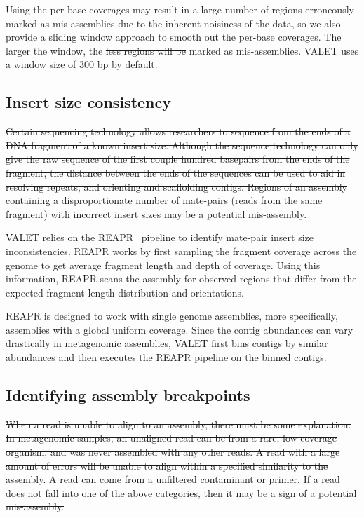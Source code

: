 \documentclass[12pt,\mydriver]{thesis}
\providecommand{\DIFaddtex}[1]{{\protect\color{blue}\uwave{#1}}} %
\providecommand{\DIFdeltex}[1]{{\protect\color{red}\sout{#1}}}                      %
\providecommand{\DIFaddbegin}{} %
\providecommand{\DIFaddend}{} %
\providecommand{\DIFdelbegin}{} %
\providecommand{\DIFdelend}{} %
\providecommand{\DIFadd}[1]{\texorpdfstring{\DIFaddtex{#1}}{#1}} %
\providecommand{\DIFdel}[1]{\texorpdfstring{\DIFdeltex{#1}}{}} %
\begin{document}
Using the per-base coverages may result in a large number of regions erroneously marked as mis-assemblies due to the inherent noisiness of the data, so we also provide a sliding window approach to smooth out the per-base coverages. The larger the window, the \DIFdelbegin \DIFdel{less regions will be }\DIFdelend \DIFaddbegin \DIFadd{fewer the regions }\DIFaddend marked as mis-assemblies.
VALET uses a window size of 300 bp by default.

\subsection{Insert size consistency}
\DIFdelbegin \DIFdel{Certain sequencing technology allows researchers to sequence from the ends of a DNA fragment of a known insert size.  Although the sequence technology can only give the raw sequence of the first couple hundred basepairs from the ends of the fragment, the distance between the ends of the sequences can be used to aid in resolving repeats, and orienting and scaffolding contigs.  Regions of an assembly containing a disproportionate number of mate-pairs (reads from the same fragment) with incorrect insert sizes may be a potential mis-assembly.
}\DIFdelend 


VALET relies on the REAPR~\cite{hunt2013reapr} pipeline to identify mate-pair insert size inconsistencies.  REAPR works by first sampling the fragment coverage across the genome to get average fragment length and depth of coverage.  Using this information, REAPR scans the assembly for observed regions that differ from the expected fragment length distribution and orientations.

REAPR is designed to work with single genome assemblies, more specifically, assemblies with a global uniform coverage.  Since the contig abundances can vary drastically in metagenomic assemblies, VALET first bins contigs by similar abundances and then executes the REAPR pipeline on the binned contigs.

\subsection{Identifying assembly breakpoints}
\DIFdelbegin \DIFdel{When a read is unable to align to an assembly, there must be some explanation.
In metagenomic samples, an unaligned read can be from a rare, low coverage organism, and was never assembled with any other reads.
A read with a large amount of errors will be unable to align within a specified similarity to the assembly.
A read can come from a unfiltered contaminant or primer.
If a read does not fall into one of the above categories, then it may be a sign of a potential mis-assembly.
}\DIFdelend 
\end{document}
